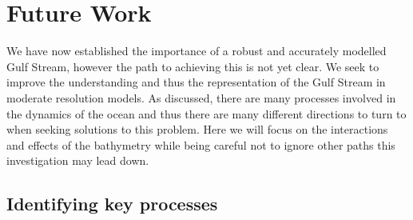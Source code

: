 \documentclass[..\EOYR.tex]{subfiles}
\begin{document}
\section{Future Work}

We have now established the importance of a robust and accurately modelled Gulf Stream, however the path to achieving this is not yet clear.
We seek to improve the understanding and thus the representation of the Gulf Stream in moderate resolution models. As discussed, there are many processes involved in the dynamics of the ocean and thus there are many different directions to turn to when seeking solutions to this problem. Here we will focus on the interactions and effects of the bathymetry while being careful not to ignore other paths this investigation may lead down. 

\subsection{Identifying key processes}


\end{document}
